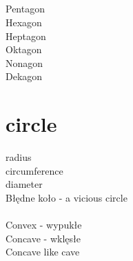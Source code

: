 \documentclass[a4paper,10pt]{article}
\begin{document}
\subsection{}
Pentagon \\
Hexagon \\
Heptagon\\
Oktagon\\
Nonagon\\
Dekagon\\

\section{circle}
radius \\
circumference \\
diameter \\

Błędne koło - a vicious circle\\
\\
Convex - wypukłe \\
Concave - wklęsłe \\
Concave like cave
\end{document}
